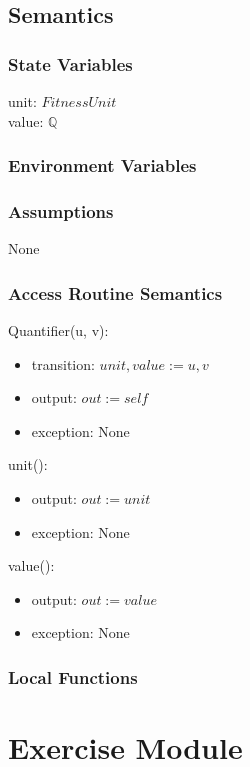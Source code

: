\documentclass[12pt, titlepage]{article}
\begin{document}
\subsection{Semantics}

\subsubsection{State Variables}
unit: $FitnessUnit$ \\
value: $\mathbb{Q}$

\subsubsection{Environment Variables}

\subsubsection{Assumptions}
None

\subsubsection{Access Routine Semantics}

Quantifier(u, v):
\begin{itemize}
	\item transition: $unit, value := u, v$
	\item output: $out := self$
	\item exception: None
\end{itemize}

unit():
\begin{itemize}
	\item output: $out := unit$
	\item exception: None
\end{itemize}

value():
\begin{itemize}
	\item output: $out := value$
	\item exception: None
\end{itemize}

\subsubsection{Local Functions}


\newpage

\section{Exercise Module}
\end{document}
